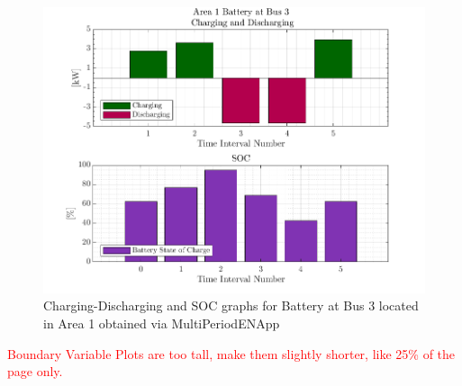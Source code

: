 \documentclass[../../outputs/main.tex]{subfiles}
\begin{document}
\begin{figure}[h!]
    \centering
    \includegraphics[width=\linewidth]{../figures/T5-pv20-batt30-genCost/dopf/BatteryPlots/macroItr_5_genCost_Battery_1_alpha_0.001.png}
    \caption{Charging-Discharging and SOC graphs for Battery at Bus 3 located in Area 1 obtained via MultiPeriodENApp}
    \label{fig:batt-plot-dopf-5-20-30-genCost}
\end{figure}

\textcolor{red}{Boundary Variable Plots are too tall, make them slightly shorter, like 25\% of the page only.}
\end{document}
